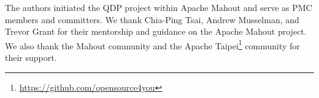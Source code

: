 \documentclass[sigconf, nonacm]{acmart}
\begin{document}

\begin{acks}
The authors initiated the QDP project within Apache Mahout and serve as PMC members and committers.
We thank Chia-Ping Tsai, Andrew Musselman, and Trevor Grant for their mentorship and guidance on the Apache Mahout project.
We also thank the Mahout community and the Apache Taipei\footnote{\url{https://github.com/opensource4you}} community for their support.
\end{acks}



\end{document}
